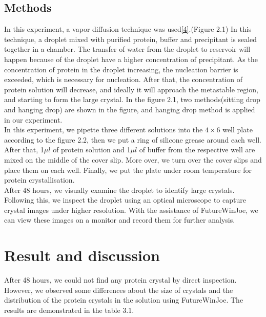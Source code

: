\documentclass[a4paper,english,12pt,bibliography=totoc]{scrreprt}
\begin{document}
\section{Methods}
In this experiment, a vapor diffusion technique was used\hyperref[sec:ref_4]{[4]}.(Figure 2.1) In this technique, a droplet mixed with purified protein, buffer and precipitant is sealed together in a chamber. The transfer of water from the droplet to reservoir will happen because of the 
droplet have a higher concentration of precipitant. As the concentration of protein in the droplet increasing, the nucleation barrier is exceeded, which is necessary for nucleation. After that, the concentration of protein solution will decrease, and ideally it will approach the metastable region, and starting to form the large crystal. In the figure 2.1, two methods(sitting drop and hanging drop) are shown in the figure, and hanging drop method is applied in our experiment.\\


In this experiment, we pipette three different solutions into the \(4 \times 6\)  well plate according to the figure 2.2, then we put a ring of silicone grease around each well. After that, 1\(\mu l\) of protein solution and 1\(\mu l\) of buffer from the respective well are mixed on the middle of the cover slip. More over, we turn over the cover slips and place them on each well. Finally, we put the plate under room temperature for protein crystallisation.\\


After 48 hours, we visually examine the droplet to identify large crystals. Following this, we inspect the droplet using an optical microscope to capture  crystal images under higher resolution. With the assistance of FutureWinJoe, we can view these images on a monitor and record them for further analysis.\\


\chapter{Result and discussion}
After 48 hours, we could not find any protein crystal by direct inspection. However, we observed some differences about the size of crystals and the distribution of the protein crystals in the solution using FutureWinJoe. The results are demonstrated in the table 3.1.
\end{document}
